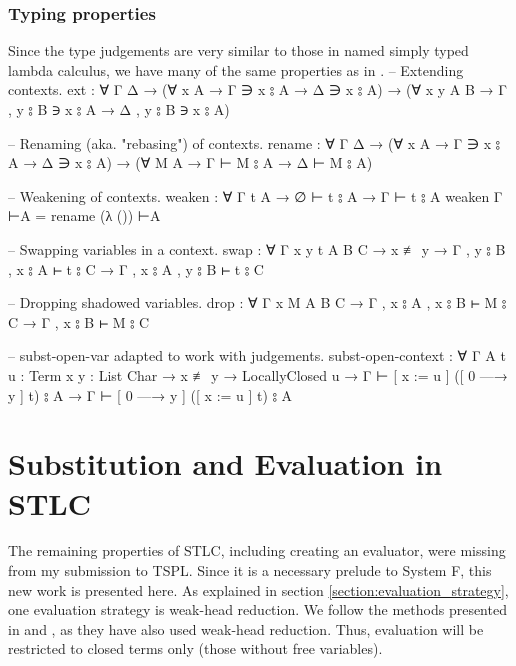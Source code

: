\documentclass[logo,bsc,singlespacing,parskip,online]{infthesis}
\renewenvironment{code}{\mintedcopy[breaklines,breaksymbolleft=\;]{agda}}{\endmintedcopy}
\begin{document}
\subsection{Typing properties}
Since the type judgements are very similar to those in named simply typed lambda calculus,
we have many of the same properties as in \citet[chapter~Lambda]{wadler_programming_2022}.
\begin{code}
-- Extending contexts.
ext : ∀ {Γ Δ}
  → (∀ {x A}     →         Γ ∋ x ⦂ A →         Δ ∋ x ⦂ A)
  → (∀ {x y A B} → Γ , y ⦂ B ∋ x ⦂ A → Δ , y ⦂ B ∋ x ⦂ A)

-- Renaming (aka. "rebasing") of contexts.
rename : ∀ {Γ Δ}
  → (∀ {x A} → Γ ∋ x ⦂ A → Δ ∋ x ⦂ A)
  → (∀ {M A} → Γ ⊢ M ⦂ A → Δ ⊢ M ⦂ A)

-- Weakening of contexts.
weaken : ∀ {Γ t A}
  → ∅ ⊢ t ⦂ A
  → Γ ⊢ t ⦂ A
weaken {Γ} ⊢A = rename (λ ()) ⊢A

-- Swapping variables in a context.
swap : ∀ {Γ x y t A B C}
  → x ≢ y
  → Γ , y ⦂ B , x ⦂ A ⊢ t ⦂ C
  → Γ , x ⦂ A , y ⦂ B ⊢ t ⦂ C

-- Dropping shadowed variables.
drop : ∀ {Γ x M A B C}
  → Γ , x ⦂ A , x ⦂ B ⊢ M ⦂ C
  → Γ , x ⦂ B ⊢ M ⦂ C

-- subst-open-var adapted to work with judgements.
subst-open-context : ∀ {Γ A} {t u : Term} {x y : List Char}
  → x ≢ y
  → LocallyClosed u
  → Γ ⊢ [ x := u ] ([ 0 —→ y ] t) ⦂ A
  → Γ ⊢ [ 0 —→ y ] ([ x := u ] t) ⦂ A
\end{code}

\chapter{Substitution and Evaluation in STLC}
The remaining properties of STLC, including creating an evaluator, were missing from my submission
to TSPL. Since it is a necessary prelude to System F, this new work is presented here. As explained
in section \ref{section:evaluation_strategy}, one evaluation strategy is weak-head reduction. We
follow the methods presented in \citet[chapter~Properties]{wadler_programming_2022} and
\citet[section~5]{chargueraud_locally_2012}, as they have also used weak-head reduction. Thus,
evaluation will be restricted to closed terms only (those without free variables).
\end{document}
